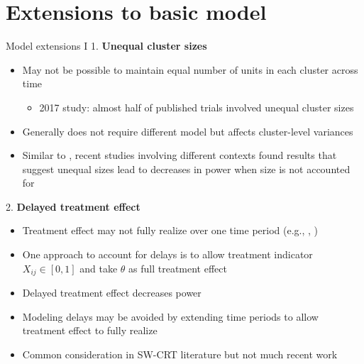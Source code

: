 \documentclass[9pt]{beamer}
\begin{document}
\section{Extensions to basic model}



\begin{frame}{Model extensions I}
1. \textbf{Unequal cluster sizes}
\begin{itemize}

\item
May not be possible to maintain equal number of units in each cluster across time
\begin{itemize}
\item
2017 study: almost half of published trials involved unequal cluster sizes \citep{Kristunas:2017}
\end{itemize}

\item
Generally does not require different model but affects cluster-level variances

\item
Similar to \citet{Hussey:2007}, recent studies \citep{Martin:2019,Ouyang:2020,Kasza:2021,Tian:2021} involving different contexts found results that suggest unequal sizes lead to decreases in power when size is not accounted for

\end{itemize}
\vspace{2em}

2. \textbf{Delayed treatment effect}
\begin{itemize}

\item
Treatment effect may not fully realize over one time period (e.g., \citep{Hughes:2015}, \citep{Agius:2020})

\item
One approach to account for delays is to allow treatment indicator $X_{ij}\in[0,1]$ and take $\theta$ as full treatment effect

\item
Delayed treatment effect decreases power \citep{Hussey:2007}

\item
Modeling delays may be avoided by extending time periods to allow treatment effect to fully realize

\item
Common consideration in SW-CRT literature but not much recent work

\end{itemize}
\end{frame}
\end{document}
